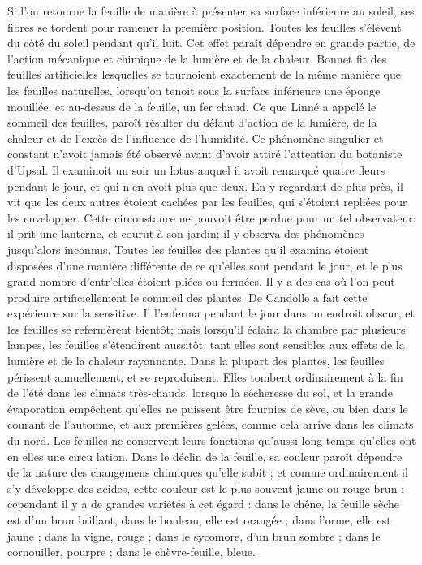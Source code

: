 Si l'on retourne la feuille de manière à présenter sa surface inférieure au soleil, ses fibres se tordent pour ramener la première position. Toutes les feuilles s'élèvent du côté du soleil pendant qu'il luit. Cet effet paraît dépendre en grande partie, de l'action mécanique et chimique de la lumière et de la chaleur. Bonnet fit des feuilles artificielles lesquelles se tournoient exactement de la même manière que les feuilles naturelles, lorsqu'on tenoit sous la surface inférieure une éponge mouillée, et au-dessus de la feuille, un fer chaud.
Ce que Linné a appelé le sommeil des feuilles, paroît résulter du défaut d'action de la lumière, de la chaleur et de l'excès de l'influence de l'humidité. Ce phénomène singulier et constant n'avoit jamais été observé avant d'avoir attiré l'attention du botaniste d'Upsal. Il examinoit un soir un lotus auquel il avoit remarqué quatre fleurs pendant le jour, et qui n'en avoit plus que deux. En y regardant de plus près, il vit que les deux autres étoient cachées par les feuilles, qui s'étoient repliées pour les envelopper. Cette\setcounter{page}{385} circonstance ne pouvoit être perdue pour un tel observateur: il prit une lanterne, et courut à son jardin; il y observa des phénomènes jusqu'alors inconnus. Toutes les feuilles des plantes qu'il examina étoient disposées d'une manière différente de ce qu'elles sont pendant le jour, et le plus grand nombre d'entr'elles étoient pliées ou fermées.
Il y a des cas où l'on peut produire artificiellement le sommeil des plantes. De Candolle a fait cette expérience sur la sensitive. Il l'enferma pendant le jour dans un endroit obscur, et les feuilles se refermèrent bientôt; mais lorsqu'il éclaira la chambre par plusieurs lampes, les feuilles s'étendirent aussitôt, tant elles sont sensibles aux effets de la lumière et de la chaleur rayonnante.
Dans la plupart des plantes, les feuilles périssent annuellement, et se reproduisent. Elles tombent ordinairement à la fin de l'été dans les climats très-chauds, lorsque la sécheresse du sol, et la grande évaporation empêchent qu'elles ne puissent être fournies de sève, ou bien dans le courant de l'automne, et aux premières gelées, comme cela arrive dans les climats du nord. Les feuilles ne conservent leurs fonctions qu'aussi long-temps qu'elles ont en elles une circu\setcounter{page}{386} lation. Dans le déclin de la feuille, sa couleur paroît dépendre de la nature des changemens chimiques qu'elle subit ; et comme ordinairement il s'y développe des acides, cette couleur est le plus souvent jaune ou rouge brun : cependant il y a de grandes variétés à cet égard : dans le chêne, la feuille sèche est d'un brun brillant, dans le bouleau, elle est orangée ; dans l'orme, elle est jaune ; dans la vigne, rouge ; dans le sycomore, d'un brun sombre ; dans le cornouiller, pourpre ; dans le chèvre-feuille, bleue.
